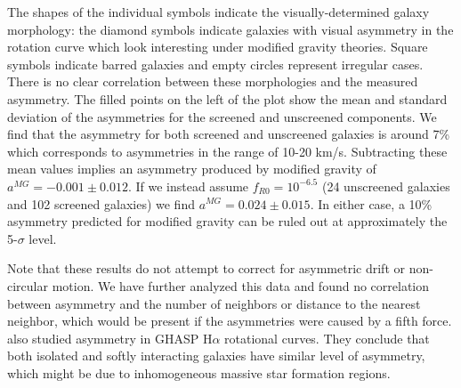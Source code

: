 \documentclass[useAMS,usenatbib,twocolumn]{mn2e}
\newcommand{\ha}{H$\alpha$}
\begin{document}
The shapes of the individual symbols indicate the visually-determined galaxy
morphology: the diamond symbols indicate
galaxies with visual asymmetry in the rotation curve which look interesting
under modified gravity theories. Square symbols indicate barred
galaxies and empty circles represent irregular cases.
There is no clear correlation between these morphologies and the
measured asymmetry.   The filled points on the left of the plot show the
mean and standard deviation of the asymmetries for the screened and unscreened
components. We find that the asymmetry for both
screened and unscreened galaxies is around 7\% which corresponds to
asymmetries in the range of 10-20 km/s.
Subtracting these mean values implies an asymmetry produced by modified
gravity of $a^{MG}=-0.001\pm 0.012$.
If we instead assume $f_{R0}=10^{-6.5}$ (24 unscreened galaxies and 102
screened galaxies) we find $a^{MG}=0.024\pm 0.015$.
In either case, a 10\% asymmetry predicted for modified gravity can be
ruled out at approximately the 5-$\sigma$ level.

Note that
these results do not attempt to correct for asymmetric drift or non-circular
motion.  We have further analyzed this data and found no correlation between
asymmetry and the number of neighbors or distance to the nearest neighbor,
which would be present if the asymmetries were caused by a fifth force.
\citet{garrido05} also studied asymmetry in
GHASP \ha{} rotational curves. They conclude that both isolated and softly
interacting galaxies have similar level of asymmetry, which might be due to
inhomogeneous massive star formation regions.


% 
\end{document}
